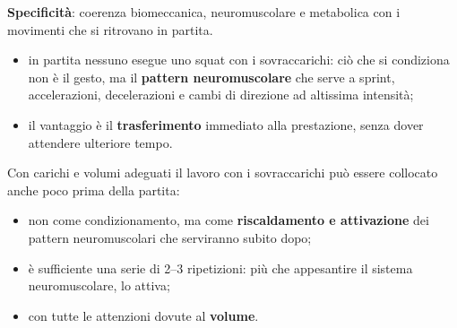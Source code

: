 \textbf{Specificità}: coerenza biomeccanica, neuromuscolare e metabolica con i movimenti che si
ritrovano in partita.
\begin{itemize}
  \item in partita nessuno esegue uno squat con i sovraccarichi: ciò che si condiziona non è il
    gesto, ma il \textbf{pattern neuromuscolare} che serve a sprint, accelerazioni, decelerazioni e
    cambi di direzione ad altissima intensità;
  \item il vantaggio è il \textbf{trasferimento} immediato alla prestazione, senza dover attendere
    ulteriore tempo.
\end{itemize}

Con carichi e volumi adeguati il lavoro con i sovraccarichi può essere collocato anche poco prima
della partita:
\begin{itemize}
  \item non come condizionamento, ma come \textbf{riscaldamento e attivazione} dei pattern
    neuromuscolari che serviranno subito dopo;
  \item è sufficiente una serie di 2--3 ripetizioni: più che appesantire il sistema neuromuscolare,
    lo attiva;
  \item con tutte le attenzioni dovute al \textbf{volume}.
\end{itemize}
